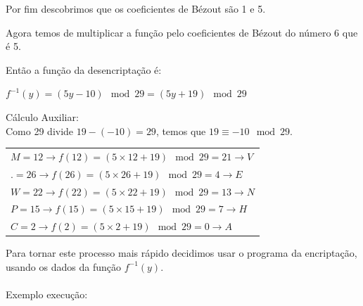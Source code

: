\documentclass[12pt]{article}
\begin{document}
    \noindent Por fim descobrimos que os coeficientes de Bézout são 1 e 5.
    
    \vspace{0.5cm}
    \noindent Agora temos de multiplicar a função pelo coeficientes de Bézout do número 6 que é 5.
    \begin{center}
        \noindent {}
    \end{center}
    
    \newpage
    \noindent Então a função da desencriptação é:
    \begin{center}
    \noindent \(f^{-1}(y) = (5y - 10) \mod29 = (5y + 19) \mod29\)
    \end{center}
    
    \noindent Cálculo Auxiliar:\\
    Como 29 divide \(19 - (-10) = 29\), temos que \(19 \equiv -10 \mod29\).
    
    \noindent
    
    \begin{center}
    \begin{tabular}{@{}l@{}}
    \(M = 12 \rightarrow f(12) = (5 \times 12 + 19) \mod 29 = 21 \rightarrow V \)\\
    \(. = 26 \rightarrow f(26) = (5 \times 26 + 19) \mod 29 = 4 \rightarrow E \)\\
    \(W = 22 \rightarrow f(22) = (5 \times 22 + 19) \mod 29 = 13 \rightarrow N \)\\
    \(P = 15 \rightarrow f(15) = (5 \times 15 + 19) \mod 29 = 7 \rightarrow H \)\\
    \(C = 2 \rightarrow f(2) = (5 \times 2 + 19) \mod 29 = 0 \rightarrow A \)\\
    \end{tabular}
    \end{center}
    \noindent Para tornar este processo mais rápido decidimos usar o programa da encriptação, usando os dados da função \(f^{-1}(y)\).\\\\
    Exemplo execução:
    \begin{center}
    \end{center}
    
\end{document}

